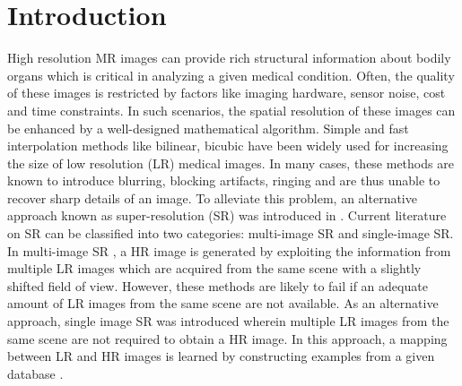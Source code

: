 \documentclass{article}
\begin{document}
\section{Introduction}
\label{sec:intro}
\vspace{-.3cm}
High resolution MR images can provide rich structural information about bodily organs which is critical in analyzing a given medical condition. Often, the quality of these images is restricted by factors like imaging hardware, sensor noise, cost and time constraints. In such scenarios, the spatial resolution of these images can be enhanced by a well-designed mathematical algorithm. Simple and fast interpolation methods like bilinear, bicubic \cite{lehmann1999survey} have been widely used for increasing the size of low resolution (LR) medical images. In many cases, these methods are known to introduce blurring, blocking artifacts, ringing and are thus unable to recover sharp details of an image. To alleviate this problem, an alternative approach known as super-resolution (SR) was introduced in \cite{tsai1984multiframe}. Current literature on SR can be classified into two categories: multi-image SR and single-image SR.\\
In multi-image SR \cite{tsai1984multiframe, farsiu2004fast}, a HR image is generated by exploiting the information from multiple LR images which are acquired from the same scene with a slightly shifted field of view. However, these methods are likely to fail if an adequate amount of LR images from the same scene are not available. As an alternative approach, single image SR was introduced wherein multiple LR images from the same scene are not required to obtain a HR image. In this approach, a mapping between LR and HR images is learned by constructing examples from a given database \cite{trinh2014novel, freeman2002example, chang2004super, yang2010image, bahrami2016reconstruction}. \\
\end{document}
